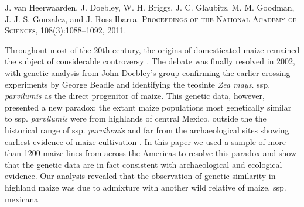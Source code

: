 \documentclass[11pt,letterpaper]{article}
\begin{document}
\large{ 
J. van Heerwaarden, J. Doebley, W. H. Briggs, J. C. Glaubitz, M. M. Goodman, J. J. S. Gonzalez, and J. Ross-Ibarra. 
\textsc{Proceedings of the National Academy of Sciences}, 108(3):1088–1092, 2011.}

\vspace{1cm}

\noindent Throughout most of the 20th century, the origins of domesticated maize remained the subject of considerable controversy \citep{doebley2004genetics}. 
The debate was finally resolved in 2002, with genetic analysis from John Doebley's group \citep{matsuoka2002single} confirming the earlier crossing experiments by George Beadle \citep{beadle1972mystery} and identifying the teosinte \emph{Zea mays.} ssp. \emph{parvilumis} as the direct progenitor of maize. 
This genetic data, however, presented a new paradox: the extant maize populations most genetically similar to ssp. \emph{parvilumis} were from highlands of central Mexico, outside the the historical range of ssp. \emph{parvilumis} \citep{hufford2012inferences} and far from the archaeological sites showing earliest evidence of maize cultivation \citep{hastorf2009rio, piperno2009starch, pohl2007microfossil}.
In this paper we used a sample of more than 1200 maize lines from across the Americas to resolve this paradox and show that the genetic data are in fact consistent with archaeological and ecological evidence.
Our analysis revealed that the observation of genetic similarity in highland maize was due to admixture with another wild relative of maize, ssp. {mexicana} \citep{van2011genetic}


\end{document}
